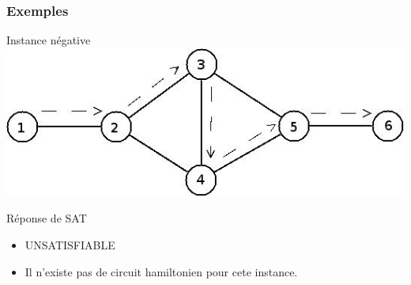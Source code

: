 \begin{frame}
\frametitle{Exemples}
\begin{block}{Instance n\'egative}
\includegraphics[scale=0.3]{negatif.jpeg}
\end{block}
\begin{block}{R\'eponse de SAT}
  \begin{itemize}
  \item UNSATISFIABLE
  \item Il n'existe pas de circuit hamiltonien pour cete instance.
  \end{itemize}
\end{block}
\end{frame}
